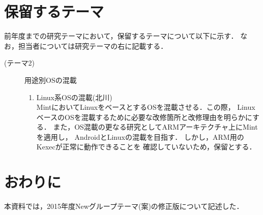 \documentclass[12pt]{jsarticle}
\begin{document}
\section{保留するテーマ}
前年度までの研究テーマにおいて，保留するテーマについて以下に示す．
なお，担当者については研究テーマの右に記載する．
\begin{description}
    \item[(テーマ2)]用途別OSの混載
        \begin{enumerate}
            \item Linux系OSの混載(北川)\\
                MintにおいてLinuxをベースとするOSを混載させる．この際，
                LinuxベースのOSを混載するために必要な改修箇所と改修理由を明らかにする．
                また，OS混載の更なる研究としてARMアーキテクチャ上にMintを適用し，
                AndroidとLinuxの混載を目指す．
                しかし，ARM用のKexecが正常に動作できることを
                確認していないため，保留とする．
        \end{enumerate}
\end{description}
\section{おわりに}
本資料では，2015年度Newグループテーマ(案)の修正版について記述した．
\end{document}
